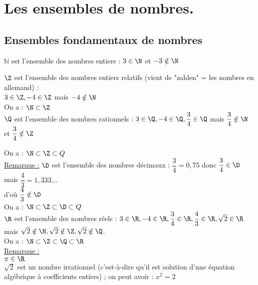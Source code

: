 \ifdefined\COMPLETE
\else
    
    
\fi


\section{Les ensembles de nombres.}

\subsection{Ensembles fondamentaux de nombres}

$\mathbb{N}$ est l'ensemble des nombres entiers  : $ 3 \in \N $ et $-3 \notin \N$

$ \Z $ est l'ensemble des nombres entiers relatifs (vient de "zahlen" = les nombres en allemand) : \\ $ 3 \in \Z, -4 \in \Z $ mais $ -4 \notin \N $ \\

On a : $ \N \subset \Z $ \\


$ \Q $ est l'ensemble des nombres rationnels : $ 3 \in \Q, -4 \in \Q, \dfrac{3}{4} \in \Q $ mais $ \dfrac{3}{4} \notin \N $ et $ \dfrac{3}{4} \notin \Z $

On a : $ \N \subset \Z \subset Q $ \\

\underline{Remarque :} $ \D $ est l'ensemble des nombres décimaux : $ \dfrac{3}{4} = 0,75 $ donc $ \dfrac{3}{4} \in \D $ mais  $ \dfrac{4}{3} = 1,333... $ \\ d'où $ \dfrac{4}{3} \notin \D $ \\ 

On a : $ \N \subset \Z \subset \D \subset Q $ \\

$ \R $ est l'ensemble des nombres réels : $ 3 \in \R, -4 \in \R, \dfrac{3}{4} \in \R, \dfrac{4}{3} \in \R, \sqrt{2} \in \R $ \\ mais $ \sqrt{2} \notin \N, \sqrt{2} \notin \Z, \sqrt{2} \notin \Q $. \\

On a : $ \N \subset \Z \subset \Q \subset \R $ \\

\underline{Remarque :} \\ $ \pi \in \R $ \\
$ \sqrt{2} $ est un nombre irrationnel  (c'est-à-dire qu'il est solution d'une équation algébrique à coefficients entiers) ; on peut avoir : $ x^{2} = 2 $ \\

